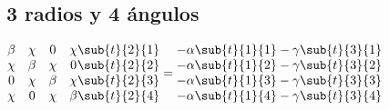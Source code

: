\subsection{3 radios y 4 ángulos}
\(
\begin{matrix}
  \beta & \chi & 0 & \chi \\
  \chi & \beta & \chi & 0 \\
  0 & \chi & \beta & \chi \\
  \chi & 0 & \chi & \beta
\end{matrix} \begin{matrix}
  \sub{t}{2}{1} \\
  \sub{t}{2}{2} \\
  \sub{t}{2}{3} \\
  \sub{t}{2}{4} \\
\end{matrix} = \begin{matrix}
  -\alpha \sub{t}{1}{1} -\gamma \sub{t}{3}{1} \\
  -\alpha \sub{t}{1}{2} -\gamma \sub{t}{3}{2} \\
  -\alpha \sub{t}{1}{3} -\gamma \sub{t}{3}{3} \\
  -\alpha \sub{t}{1}{4} -\gamma \sub{t}{3}{4} \\
\end{matrix} \\
\)


